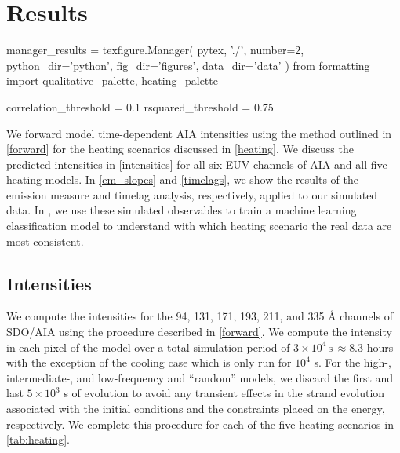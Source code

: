 \section{Results}\label{results}

\begin{pycode}
manager_results = texfigure.Manager(
    pytex,
    './',
    number=2,
    python_dir='python',
    fig_dir='figures',
    data_dir='data'
)
from formatting import qualitative_palette, heating_palette

correlation_threshold = 0.1
rsquared_threshold = 0.75
\end{pycode}

We forward model time-dependent AIA intensities using the method outlined in \autoref{forward} for the heating scenarios discussed in \autoref{heating}. We discuss the predicted intensities in \autoref{intensities} for all six EUV channels of AIA and all five heating models. In \autoref{em_slopes} and \autoref{timelags}, we show the results of the emission measure and timelag analysis, respectively, applied to our simulated data. In , we use these simulated observables to train a machine learning classification model to understand with which heating scenario the real data are most consistent.

\subsection{Intensities}\label{intensities}

We compute the intensities for the 94, 131, 171, 193, 211, and 335 \AA{} channels of SDO/AIA using the procedure described in \autoref{forward}. We compute the intensity in each pixel of the model \AR{} over a total simulation period of $3\times10^4\,\mathrm{s}\,\approx8.3$ hours with the exception of the cooling case which is only run for $10^4$ s. For the high-, intermediate-, and low-frequency and ``random'' models, we discard the first and last $5\times10^3$ s of evolution to avoid any transient effects in the strand evolution associated with the initial conditions and the constraints placed on the energy, respectively. We complete this procedure for each of the five heating scenarios in \autoref{tab:heating}.

